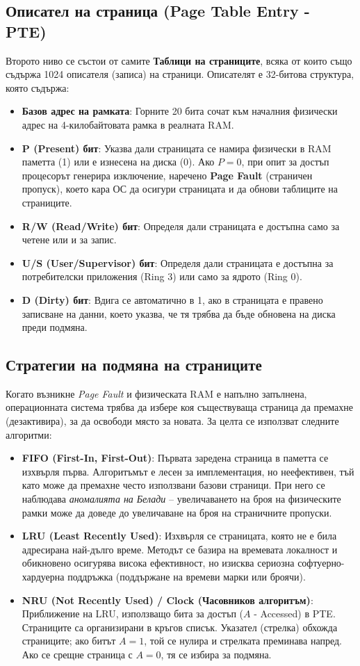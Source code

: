 \documentclass{scrartcl}
\begin{document}
\begin{FlushLeft}
\subsection{Описател на страница (Page Table Entry - PTE)}
Второто ниво се състои от самите \textbf{Таблици на страниците}, всяка от които също съдържа 1024 описателя (записа) на страници. Описателят е 32-битова структура, която съдържа:
\begin{itemize}
    \item \textbf{Базов адрес на рамката}: Горните 20 бита сочат към началния физически адрес на 4-килобайтовата рамка в реалната RAM.
    \item \textbf{P (Present) бит}: Указва дали страницата се намира физически в RAM паметта (1) или е изнесена на диска (0). Ако $P=0$, при опит за достъп процесорът генерира изключение, наречено \textbf{Page Fault} (страничен пропуск), което кара ОС да осигури страницата и да обнови таблиците на страниците.
    \item \textbf{R/W (Read/Write) бит}: Определя дали страницата е достъпна само за четене или и за запис.
    \item \textbf{U/S (User/Supervisor) бит}: Определя дали страницата е достъпна за потребителски приложения (Ring 3) или само за ядрото (Ring 0).
    \item \textbf{D (Dirty) бит}: Вдига се автоматично в 1, ако в страницата е правено записване на данни, което указва, че тя трябва да бъде обновена на диска преди подмяна.
\end{itemize}

\subsection{Стратегии на подмяна на страниците}
Когато възникне \textit{Page Fault} и физическата RAM е напълно запълнена, операционната система трябва да избере коя съществуваща страница да премахне (дезактивира), за да освободи място за новата. За целта се използват следните алгоритми:
\begin{itemize}
    \item \textbf{FIFO (First-In, First-Out)}: Първата заредена страница в паметта се изхвърля първа. Алгоритъмът е лесен за имплементация, но неефективен, тъй като може да премахне често използвани базови страници. При него се наблюдава \textit{аномалията на Белади} – увеличаването на броя на физическите рамки може да доведе до увеличаване на броя на страничните пропуски.
    \item \textbf{LRU (Least Recently Used)}: Изхвърля се страницата, която не е била адресирана най-дълго време. Методът се базира на времевата локалност и обикновено осигурява висока ефективност, но изисква сериозна софтуерно-хардуерна поддръжка (поддържане на времеви марки или броячи).
    \item \textbf{NRU (Not Recently Used) / Clock (Часовников алгоритъм)}: Приближение на LRU, използващо бита за достъп ($A$ - Accessed) в PTE. Страниците са организирани в кръгов списък. Указател (стрелка) обхожда страниците; ако битът $A=1$, той се нулира и стрелката преминава напред. Ако се срещне страница с $A=0$, тя се избира за подмяна.
\end{itemize}


\end{FlushLeft}
\end{document}
